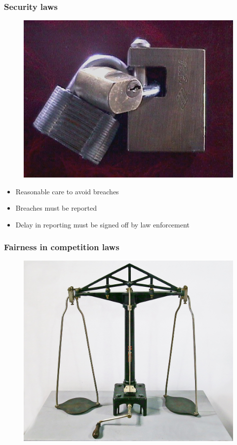 \begin{frame}[fragile]
\frametitle{Security laws}


\begin{figure}
\includegraphics{security}
\end{figure}

\end{frame}


\begin{itemize}
\item Reasonable care to avoid breaches
\item Breaches must be reported
\item Delay in reporting must be signed off by law enforcement
\end{itemize}

\begin{frame}[fragile]
\frametitle{Fairness in competition laws}


\begin{figure}
\includegraphics[scale=0.1]{scale}
\end{figure}

\end{frame}


